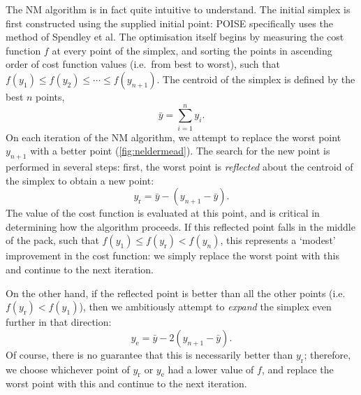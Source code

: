 The NM algorithm is in fact quite intuitive to understand.
The initial simplex is first constructed using the supplied initial point: POISE specifically uses the method of Spendley et al.\autocite{Spendley1962T}
The optimisation itself begins by measuring the cost function $f$ at every point of the simplex, and sorting the points in ascending order of cost function values (i.e.\ from best to worst), such that $f(y_1) \leq f(y_2) \leq \cdots \leq f(y_{n+1})$.
The centroid of the simplex is defined by the best $n$ points,
\begin{equation}
    \label{eq:simplex_centroid}
    \bar{y} = \sum_{i=1}^n y_i.
\end{equation}
On each iteration of the NM algorithm, we attempt to replace the worst point $y_{n+1}$  with a better point (\cref{fig:neldermead}).
The search for the new point is performed in several steps: first, the worst point is \textit{reflected} about the centroid of the simplex to obtain a new point:
\begin{equation}
    \label{eq:nm_reflect}
    y_\text{r} = \bar{y} - (y_{n+1} - \bar{y}).
\end{equation}
The value of the cost function is evaluated at this point, and is critical in determining how the algorithm proceeds.
If this reflected point falls in the middle of the pack, such that $f(y_1) \leq f(y_\text{r}) < f(y_n)$, this represents a `modest' improvement in the cost function: we simply replace the worst point with this and continue to the next iteration.

On the other hand, if the reflected point is better than all the other points (i.e.\ $f(y_\text{r}) < f(y_1)$), then we ambitiously attempt to \textit{expand} the simplex even further in that direction:
\begin{equation}
    \label{eq:nm_expand}
    y_\text{e} = \bar{y} - 2(y_{n+1} - \bar{y}).
\end{equation}
Of course, there is no guarantee that this is necessarily better than $y_\text{r}$; therefore, we choose whichever point of $y_\text{r}$ or $y_\text{e}$ had a lower value of $f$, and replace the worst point with this and continue to the next iteration.

